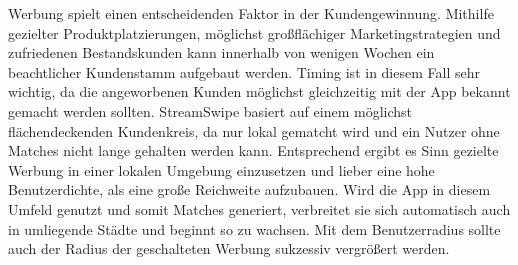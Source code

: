 \noindent
Werbung spielt einen entscheidenden Faktor in der Kundengewinnung. Mithilfe gezielter Produktplatzierungen, möglichst großflächiger Marketingstrategien und zufriedenen Bestandskunden kann innerhalb von wenigen Wochen ein beachtlicher Kundenstamm aufgebaut werden. Timing ist in diesem Fall sehr wichtig, da die angeworbenen Kunden möglichst gleichzeitig mit der App bekannt gemacht werden sollten. StreamSwipe basiert auf einem möglichst flächendeckenden Kundenkreis, da nur lokal gematcht wird und ein Nutzer ohne Matches nicht lange gehalten werden kann. Entsprechend ergibt es Sinn gezielte Werbung in einer lokalen Umgebung einzusetzen  und lieber eine hohe Benutzerdichte, als eine große Reichweite aufzubauen. Wird die App in diesem Umfeld genutzt und somit Matches generiert, verbreitet sie sich automatisch auch in umliegende Städte und beginnt so zu wachsen. Mit dem Benutzerradius sollte auch der Radius der geschalteten Werbung sukzessiv vergrößert werden.